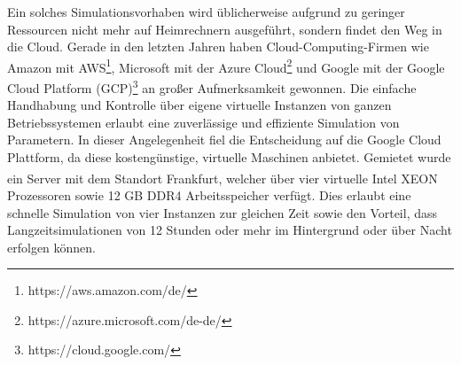 	Ein solches Simulationsvorhaben wird üblicherweise aufgrund zu geringer Ressourcen nicht mehr auf Heimrechnern ausgeführt, sondern findet den Weg in die Cloud. Gerade in den letzten Jahren haben Cloud-Computing-Firmen wie Amazon mit AWS\footnote{https://aws.amazon.com/de/}, Microsoft mit der Azure Cloud\footnote{https://azure.microsoft.com/de-de/} und Google mit der Google Cloud Platform (GCP)\footnote{https://cloud.google.com/} an großer Aufmerksamkeit gewonnen. Die einfache Handhabung und Kontrolle über eigene virtuelle Instanzen von ganzen Betriebssystemen erlaubt eine zuverlässige und effiziente Simulation von Parametern. In dieser Angelegenheit fiel die Entscheidung auf die Google Cloud Plattform, da diese kostengünstige, virtuelle Maschinen anbietet. Gemietet wurde ein Server mit dem Standort Frankfurt, welcher über vier virtuelle Intel XEON\textsuperscript{\textregistered} Prozessoren sowie 12 GB DDR4 Arbeitsspeicher verfügt. Dies erlaubt eine schnelle Simulation von vier Instanzen zur gleichen Zeit sowie den Vorteil, dass Langzeitsimulationen von 12 Stunden oder mehr im Hintergrund oder über Nacht erfolgen können.
	
